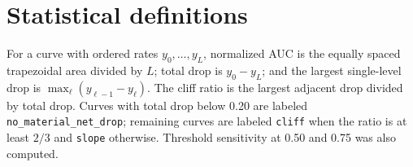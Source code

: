 \documentclass{article}
\begin{document}
\begin{table}[h]
  \caption{Complete four-deployment vision iframe task-success grid. Entries are successes out of ten trials. S denotes same-origin and X cross-origin; depth 0 is the shared level-0 control and is repeated across the two blocks for comparison. The bottom four rows are the vision-only extension.}
  \label{tab:vision-model-task-cells}
  \centering
  \small
  \setlength{\tabcolsep}{3pt}
\end{table}

\section{Statistical definitions}
\label{app:statistics}

For a curve with ordered rates $y_0,\ldots,y_L$, normalized AUC is the equally spaced trapezoidal area divided by $L$; total drop is $y_0-y_L$; and the largest single-level drop is $\max_{\ell}(y_{\ell-1}-y_\ell)$. The cliff ratio is the largest adjacent drop divided by total drop. Curves with total drop below 0.20 are labeled \texttt{no\_material\_net\_drop}; remaining curves are labeled \texttt{cliff} when the ratio is at least $2/3$ and \texttt{slope} otherwise. Threshold sensitivity at 0.50 and 0.75 was also computed.
\end{document}
